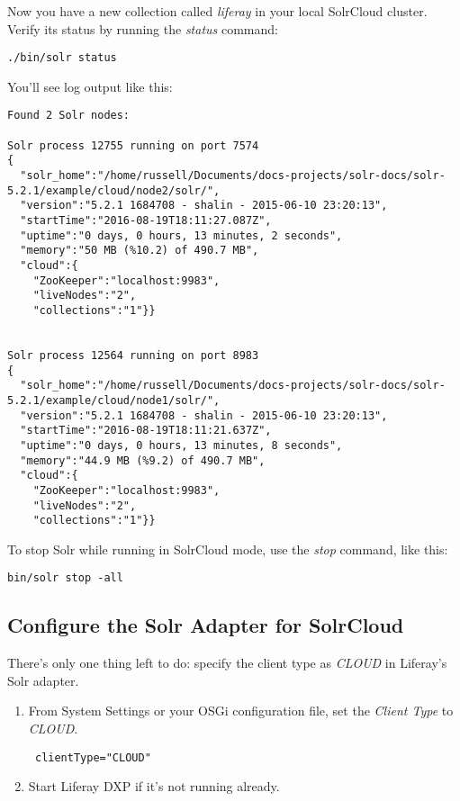 Now you have a new collection called \emph{liferay} in your local
SolrCloud cluster. Verify its status by running the \emph{status}
command:

\begin{verbatim}
./bin/solr status
\end{verbatim}

You'll see log output like this:

\begin{verbatim}
Found 2 Solr nodes: 

Solr process 12755 running on port 7574
{
  "solr_home":"/home/russell/Documents/docs-projects/solr-docs/solr-5.2.1/example/cloud/node2/solr/",
  "version":"5.2.1 1684708 - shalin - 2015-06-10 23:20:13",
  "startTime":"2016-08-19T18:11:27.087Z",
  "uptime":"0 days, 0 hours, 13 minutes, 2 seconds",
  "memory":"50 MB (%10.2) of 490.7 MB",
  "cloud":{
    "ZooKeeper":"localhost:9983",
    "liveNodes":"2",
    "collections":"1"}}


Solr process 12564 running on port 8983
{
  "solr_home":"/home/russell/Documents/docs-projects/solr-docs/solr-5.2.1/example/cloud/node1/solr/",
  "version":"5.2.1 1684708 - shalin - 2015-06-10 23:20:13",
  "startTime":"2016-08-19T18:11:21.637Z",
  "uptime":"0 days, 0 hours, 13 minutes, 8 seconds",
  "memory":"44.9 MB (%9.2) of 490.7 MB",
  "cloud":{
    "ZooKeeper":"localhost:9983",
    "liveNodes":"2",
    "collections":"1"}}
\end{verbatim}

To stop Solr while running in SolrCloud mode, use the \emph{stop}
command, like this:

\begin{verbatim}
bin/solr stop -all
\end{verbatim}

\subsection{Configure the Solr Adapter for
SolrCloud}\label{configure-the-solr-adapter-for-solrcloud}

There's only one thing left to do: specify the client type as
\emph{CLOUD} in Liferay's Solr adapter.

\begin{enumerate}
\def\labelenumi{\arabic{enumi}.}
\item
  From System Settings or your OSGi configuration file, set the
  \emph{Client Type} to \emph{CLOUD}.

\begin{verbatim}
 clientType="CLOUD"
\end{verbatim}
\item
  Start Liferay DXP if it's not running already.
\end{enumerate}

